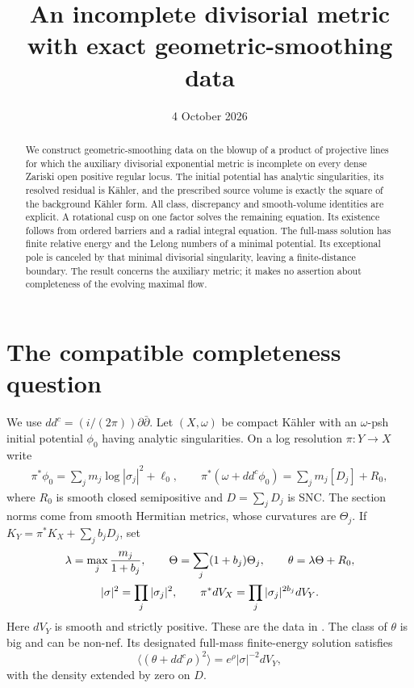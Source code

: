 \documentclass[11pt]{article}
\title{An incomplete divisorial metric with exact geometric-smoothing data}
\author{}
\date{4 October 2026}
\newcommand{\ddc}{dd^c}
\begin{document}
\maketitle
\begin{abstract}
We construct geometric-smoothing data on the blowup of a product of
projective lines for which the auxiliary divisorial exponential metric
is incomplete on every dense Zariski open positive regular locus.
The initial potential has analytic singularities, its resolved residual
is K\"ahler, and the prescribed source volume is exactly the square of
the background K\"ahler form. All class, discrepancy and smooth-volume
identities are explicit. A rotational cusp on one factor solves the
remaining equation. Its existence follows from ordered barriers and a
radial integral equation. The full-mass solution has finite relative
energy and the Lelong numbers of a minimal potential. Its exceptional
pole is canceled by that minimal divisorial singularity, leaving a
finite-distance boundary. The result concerns the auxiliary metric;
it makes no assertion about completeness of the evolving maximal flow.
\end{abstract}

\section{The compatible completeness question}
We use $\ddc=(i/(2\pi))\partial\bar\partial$.
Let $(X,\omega)$ be compact K\"ahler with an $\omega$-psh initial
potential $\phi_0$ having analytic singularities. On a log resolution
$\pi:Y\to X$ write
\begin{gather}\label{eq:resolved}
 \pi^*\phi_0=\sum_jm_j\log|\sigma_j|^2+\ell_0,\qquad
 \pi^*(\omega+\ddc\phi_0)=\sum_jm_j[D_j]+R_0,
\end{gather}
where $R_0$ is smooth closed semipositive and $D=\sum_jD_j$ is SNC.
The section norms come from smooth Hermitian metrics, whose curvatures
are $\Theta_j$. If $K_Y=\pi^*K_X+\sum_jb_jD_j$, set
\begin{gather}\label{eq:compatible}
 \lambda=\max_j\frac{m_j}{1+b_j},\qquad
 \Theta=\sum_j(1+b_j)\Theta_j,\qquad\theta=\lambda\Theta+R_0,\\
 |\sigma|^2=\prod_j|\sigma_j|^2,\qquad
 \pi^*dV_X=\prod_j|\sigma_j|^{2b_j}dV_Y.\notag
\end{gather}
Here $dV_Y$ is smooth and strictly positive. These are the data in
\cite[Sections 1.3 and 3.1]{DGL}. The class of $\theta$ is big and can
be non-nef. Its designated full-mass finite-energy solution satisfies
\begin{equation}\label{eq:target}
 \langle(\theta+\ddc\rho)^2\rangle
                      =e^\rho|\sigma|^{-2}dV_Y,
\end{equation}
with the density extended by zero on $D$.
\end{document}
